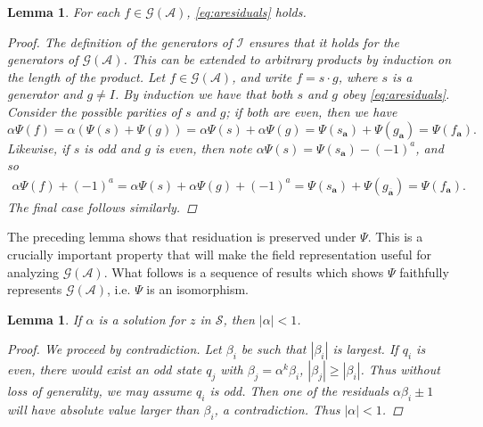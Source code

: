 \documentclass[12pt, letterpaper]{article}
\newcommand{\A}{\mathcal A}
\newcommand{\ch}[1]{\mathbf{#1}}
\newcommand{\res}[2]{{{#1}_{\ch{#2}}}}
\newcommand{\I}{\mathcal I}
\renewcommand{\S}{\mathcal S}
\newcommand{\gp}{\mathcal G}
\newcommand{\f}[1]{\overline{#1}}
\newtheorem{lemma}[thm]{Lemma}
\begin{document}
\begin{lemma}\label{lemma:residuation}
    For each $f \in \gp(\A)$, \cref{eq:aresiduals} holds.
    \begin{proof}
        The definition of the generators of $\I$ ensures that it holds for the
        generators of $\gp(\A)$. This can be extended to arbitrary products by
        induction on the length of the product. Let $f \in \gp(\A)$, and write
        $f = s \cdot g$, where $s$ is a generator and $g \ne I$. By induction
        we have that both $s$ and $g$ obey \cref{eq:aresiduals}.  Consider the
        possible parities of $s$ and $g$; if both are even, then we have
        \[
            \alpha \Psi(f) =
            \alpha (\Psi(s) + \Psi(g)) =
            \alpha \Psi(s) + \alpha \Psi(g) =
            \Psi(\res{s}{a}) + \Psi(\res{g}{a}) = \Psi(\res{f}{a}).
        \]
        Likewise, if $s$ is odd and $g$ is even, then note $\alpha \Psi(s) =
        \Psi(\res{s}{a}) - (-1)^a$, and so
        \begin{align*}
            \alpha \Psi(f) + (-1)^a =
            \alpha \Psi(s) + \alpha \Psi(g) + (-1)^a =
            \Psi(\res{s}{a}) + \Psi(\res{g}{\f{a}}) =
            \Psi(\res{f}{a}).
        \end{align*}
        The final case follows similarly.
    \end{proof}
\end{lemma}

The preceding lemma shows that residuation is preserved under $\Psi$. This is a
crucially important property that will make the field representation useful for
analyzing $\gp(\A)$. What follows is a sequence of results which shows $\Psi$
faithfully represents $\gp(\A)$, i.e. $\Psi$ is an isomorphism.

\begin{lemma}\label{lemma:z_contraction}
    If $\alpha$ is a solution for $z$ in $\S$, then $|\alpha| < 1$.
    \begin{proof}
        We proceed by contradiction. Let $\beta_i$ be such that $|\beta_i|$ is
        largest. If $q_i$ is even, there would exist an odd state $q_j$ with
        $\beta_j = \alpha^k \beta_i$, $|\beta_j| \ge |\beta_i|$. Thus without
        loss of generality, we may assume $q_i$ is odd. Then one of the
        residuals $\alpha \beta_i \pm 1$ will have absolute value larger than
        $\beta_i$, a contradiction. Thus $|\alpha| < 1$.
    \end{proof}
\end{lemma}
\end{document}

